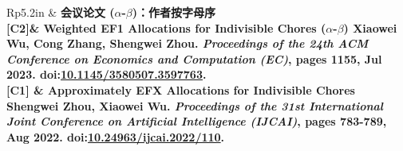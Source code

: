 \documentclass[UTF8, fontset=none, letterpaper, 11pt]{ctexart}
\newcommand{\headingfont}{\Large\bfseries\color{OliveGreen}}
\newenvironment{SectionTable}[1]{
  \renewcommand*{\arraystretch}{1.2}
  \setlength{\tabcolsep}{10pt}
  \begin{longtable}{Rp{5.2in}} & #1 \\}
{\end{longtable}\vspace{-1cm}}
\begin{document}
\begin{SectionTable}{\headingfont 会议论文 \; \small\color{black}  ($\alpha$-$\beta$)：作者按字母序}
\vspace{-0.48cm}\hypertarget{WEF1-EC23}{[C2]}&
\textbf{Weighted EF1 Allocations for Indivisible Chores} \newline
($\alpha$-$\beta$) Xiaowei Wu, Cong Zhang, Shengwei Zhou.  \newline
\textit{Proceedings of the 24th ACM Conference on Economics and Computation (EC)}, pages 1155, Jul 2023. doi:\href{https://dl.acm.org/doi/10.1145/3580507.3597763}{10.1145/3580507.3597763}.\\

\vspace{-0.48cm}\hypertarget{EFX-IJCAI22}{[C1]} &
\textbf{Approximately EFX Allocations for Indivisible Chores} \newline
Shengwei Zhou, Xiaowei Wu.  \newline
\textit{Proceedings of the 31st International Joint Conference on Artificial Intelligence (IJCAI)}, pages 783-789, Aug 2022. doi:\href{https://www.ijcai.org/proceedings/2022/110}{10.24963/ijcai.2022/110}.\\
\end{SectionTable}
\end{document}
